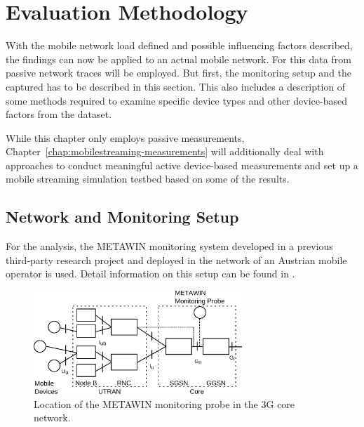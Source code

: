 \section{Evaluation Methodology}
\label{c4:sec:methodology}

With the mobile network load defined and possible influencing factors described, the findings can now be applied to an actual mobile network. For this data from passive network traces will be employed. But first, the monitoring setup and the captured has to be described in this section. This also includes a description of some methods required to examine specific device types and other device-based factors from the dataset.

While this chapter only employs passive measurements, Chapter~\ref{chap:mobilestreaming-measurements} will additionally deal with approaches to conduct meaningful active device-based measurements and set up a mobile streaming simulation testbed based on some of the results.


\subsection{Network and Monitoring Setup}

For the analysis, the \gls{METAWIN} monitoring system developed in a previous third-party research project and deployed in the network of an Austrian mobile operator is used. Detail information on this setup can be found in \cite{ricciato_2011,ricciato2006traffic}.

\begin{figure}[htb]
	\centering
	\includegraphics[width=0.7\textwidth]{images/umts-network.pdf}
	\caption{Location of the \acrshort{METAWIN} monitoring probe in the \acrshort{3G} core network.}
\label{c4:fig:umtsnetwork}
\end{figure}

